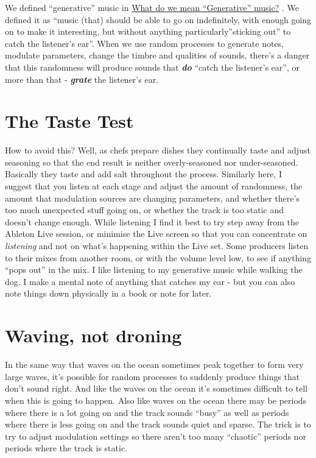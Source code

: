 \documentclass[
  12pt,
  letterpaper,
  oneside,
  open=any]{scrbook}
\begin{document}
We defined ``generative'' music in
\href{0000-Defintion-Generative.qmd}{What do we mean ``Generative''
music?} . We defined it as ``music (that) should be able to go on
indefinitely, with enough going on to make it interesting, but without
anything particularly''sticking out'' to catch the listener's ear''.
When we use random processes to generate notes, modulate parameters,
change the timbre and qualities of sounds, there's a danger that this
randomness will produce sounds that \textbf{\emph{do}} ``catch the
listener's ear'', or more than that - \textbf{\emph{grate}} the
listener's ear.

\section{The Taste Test}\label{the-taste-test}

How to avoid this? Well, as chefs prepare dishes they continually taste
and adjust seasoning so that the end result is neither overly-seasoned
nor under-seasoned. Basically they taste and add salt throughout the
process. Similarly here, I suggest that you listen at each stage and
adjust the amount of randomness, the amount that modulation sources are
changing parameters, and whether there's too much unexpected stuff going
on, or whether the track is too static and doesn't change enough. While
listening I find it best to try step away from the Ableton Live session,
or minimise the Live screen so that you can concentrate on
\emph{listening} and not on what's happening within the Live set. Some
producers listen to their mixes from another room, or with the volume
level low, to see if anything ``pops out'' in the mix. I like listening
to my generative music while walking the dog. I make a mental note of
anything that catches my ear - but you can also note things down
physically in a book or note for later.

\section{Waving, not droning}\label{waving-not-droning}

In the same way that waves on the ocean sometimes peak together to form
very large waves, it's possible for random processes to suddenly produce
things that don't sound right. And like the waves on the ocean it's
sometimes difficult to tell when this is going to happen. Also like
waves on the ocean there may be periods where there is a lot going on
and the track sounds ``busy'' as well as periods where there is less
going on and the track sounds quiet and sparse. The trick is to try to
adjust modulation settings so there aren't too many ``chaotic'' periods
nor periods where the track is static.
\end{document}
